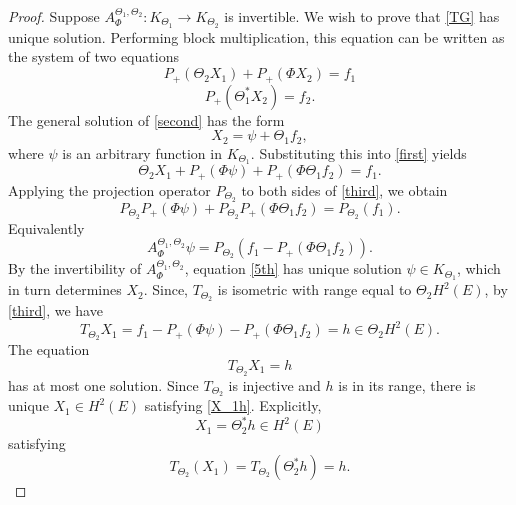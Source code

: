 \documentclass{amsart}
\theoremstyle{definition}
\def\nn{\nonumber}
\begin{document}
\begin{proof}
Suppose $A_{\Phi}^{\Theta_{1},\Theta_{2}}:K_{\Theta_{1}}\to K_{\Theta_{2}}$ is invertible. We wish to prove that \eqref{TG} has unique solution. Performing block multiplication, this equation can be written as the system of two equations
%
 \begin{equation}\label{first}
 P_{+}(\Theta_{2}X_{1})+P_{+}(\Phi X_{2})=f_{1}
 \end{equation}
 \begin{equation}\label{second}
 P_{+}(\Theta^{*}_{1}X_{2})=f_{2}.
 \end{equation}
 The general solution of \eqref{second} has the  form
 $$X_{2}=\psi+\Theta_{1}f_{2},$$
 where $\psi$ is an arbitrary function in %
  $K_{\Theta_{1}}$. Substituting this into %
  \eqref{first} yields %
 \begin{equation}\label{third}
 \Theta_{2}X_{1}+P_{+}(\Phi\psi)+P_{+}(\Phi\Theta_{1}f_{2})=f_{1}.
 \end{equation}
 Applying the projection operator $P_{\Theta_{2}}$ to both sides of \eqref{third}, we obtain
  \begin{equation}%
 P_{\Theta_{2}}P_{+}(\Phi\psi)+P_{\Theta_{2}}P_{+}(\Phi\Theta_{1}f_{2})=P_{\Theta_{2}}(f_{1}).\nn
 \end{equation}
Equivalently %
 \begin{equation}\label{5th}
 A_{\Phi}^{\Theta_{1},\Theta_{2}} \psi=P_{\Theta_{2}}(f_{1}-P_{+}(\Phi\Theta_{1}f_{2})).
 \end{equation}
 By the invertibility of $A_{\Phi}^{\Theta_{1},\Theta_{2}}$,  %
  equation \eqref{5th} has unique solution $\psi\in K_{\Theta_{1}}$, which in turn determines $X_2$. Since, $T_{\Theta_{2}}$ is isometric with range equal to $\Theta_2 H^2(E)$, by \eqref{third}, we have
  $$
 T_{\Theta_{2}}X_{1}=f_1-P_{+}(\Phi\psi)-P_{+}(\Phi\Theta_{1}f_{2})=h\in \Theta_2 H^2(E).
 $$
The equation
 \begin{equation}\label{X_1h}
     T_{\Theta_2}X_1=h
 \end{equation}
has at most one solution. 
Since $T_{\Theta_2}$  is injective and $h$ is in its range, there is unique $X_1\in H^2(E)$ satisfying \eqref{X_1h}. Explicitly, $$X_1=\Theta_2^{*} h\in H^2(E)$$
satisfying
 $$T_{\Theta_2}(X_1)=T_{\Theta_2}(\Theta_2^{*}h)=h.$$ 
 

\end{proof}
\end{document}
